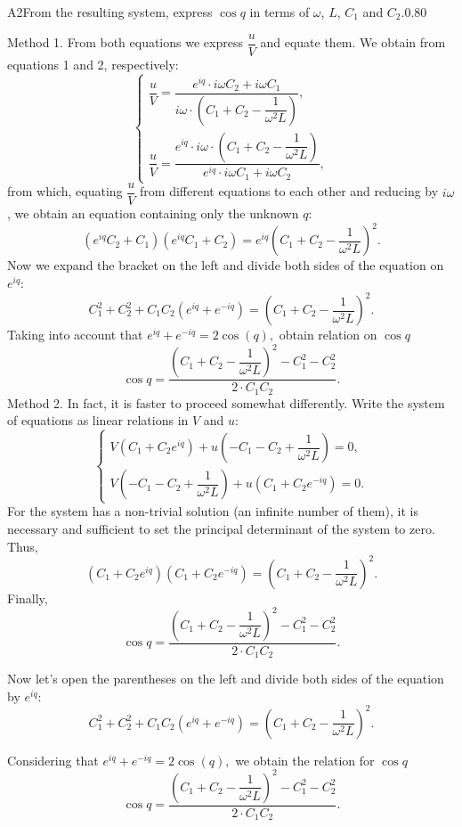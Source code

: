 \documentclass[11pt,a4paper]{article}
\begin{document}
\begin{solcard}{A2}{From the resulting system, express $\cos q $ in terms of $\omega$, $L$, $C_1$ and $C_2$.}{0.80}

Method 1. From both equations we express $\dfrac{u}{V}$ and equate them. We obtain from equations 1 and 2, respectively: $$\begin{cases} \dfrac{u}{V} = \dfrac{e^{iq} \cdot i \omega C_2 + i \omega C_1}{i \omega \cdot \left(C_1+C_2-\dfrac{1}{\omega^2 L}\right)}, \\ \dfrac{u}{V} = \dfrac{e^{iq} \cdot i \omega \cdot \left( C_1+C_2-\dfrac{1}{\omega^2 L} \right)}{e^{iq}\cdot i \omega C_1 + i \omega C_2}, \end{cases}$$ from which, equating $\dfrac{u}{V}$ from different equations to each other and reducing by $i \omega$, we obtain an equation containing only the unknown $q$: $$\left( e^{iq}C_2 +C_1 \right)\left( e^{iq}C_1 +C_2 \right) = e^{iq} \left(C_1+C_2-\dfrac{1}{\omega^2L} \right)^2.$$ Now we expand the bracket on the left and divide both sides of the equation on $e^{iq}:$ $$C_1^2+C_2^2 + C_1C_2 \left( e^{iq} + e^{-iq}\right) = \left( C_1+C_2 - \dfrac{1}{\omega^2 L}\right)^2.$$ Taking into account that $e^{iq}+e^{-iq} = 2 \cos(q),$ obtain relation on $\cos q$ $$\cos q = \dfrac{\left( C_1 + C_2 - \dfrac{1}{\omega^2 L} \right)^2-C_1^2-C_2^2}{2 \cdot C_1C_2}.$$ Method 2. In fact, it is faster to proceed somewhat differently. Write the system of equations as linear relations in $V$ and $u$: $$\begin{cases} V\left(C_1+C_2 e^{iq}\right) + u\left(-C_1-C_2+\dfrac{1}{\omega^2 L}\right) = 0,\\ V\left(-C_1-C_2+\dfrac{1}{\omega^2 L}\right) + u\left(C_1+C_2 e^{-iq}\right) = 0. \end{cases}$$ For the system has a non-trivial solution (an infinite number of them), it is necessary and sufficient to set the principal determinant of the system to zero. Thus, $$\left(C_1+C_2 e^{iq}\right)\left(C_1+C_2 e^{-iq}\right)=\left(C_1+C_2-\dfrac{1}{\omega^2 L}\right)^2.$$ Finally, $$\cos q = \dfrac{\left( C_1 + C_2 - \dfrac{1}{\omega^2 L} \right)^2-C_1^2-C_2^2}{2 \cdot C_1C_2}.$$



Now let's open the parentheses on the left and divide both sides of the equation by $e^{iq}:$ $$C_1^2+C_2^2 + C_1C_2 \left( e^{iq} + e^{-iq}\right) = \left( C_1+C_2 - \dfrac{1}{\omega^2 L}\right)^2.$$


Considering that $e^{iq}+e^{-iq} = 2 \cos(q),$ we obtain the relation for $\cos q$ $$\cos q = \dfrac{\left( C_1 + C_2 - \dfrac{1}{\omega^2 L} \right)^2-C_1^2-C_2^2}{2 \cdot C_1C_2}.$$



\end{solcard}
\end{document}
